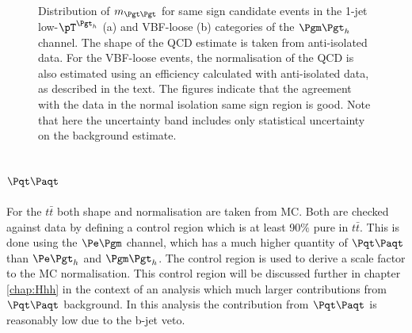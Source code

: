 \begin{figure}[htb]
\caption[Distribution of $m_{\Pgt\Pgt}$ for same sign candidate events in the
1-jet low-$\pT^{\Pgth}$ (a) and VBF-loose (b) categories of the $\mutau$
channel.]{Distribution of $m_{\Pgt\Pgt}$ for same sign candidate events in the
1-jet low-$\pT^{\Pgth}$ (a) and VBF-loose (b) categories of the $\mutau$
channel. The shape of the QCD estimate is taken from anti-isolated data. For the
VBF-loose events, the normalisation of the QCD is also estimated using an efficiency
calculated with anti-isolated data, as described in the text. 
The figures indicate that the agreement with the data in the normal isolation same sign region is good. 
Note that here the uncertainty band includes only statistical uncertainty on the
background estimate.}
\label{fig:samesign}
\end{figure}

\subsection{$\ttbar$}
\label{sec:backgroundEstimation_TT}

For the $t \bar{t}$ both shape and normalisation are taken from \ac{MC}. Both are checked
against data by defining a control region which is at least 90$\%$ pure in
$t \bar{t}$. This is done using the $\emu$ channel, which has a much higher
quantity of $\ttbar$ than $\etau$ and $\mutau$. The control region is used to
derive a scale factor to the \ac{MC} normalisation. This control region will be
discussed further in chapter \ref{chap:Hhh} in the context of an analysis which
much larger contributions from $\ttbar$ background. In this analysis the
contribution from $\ttbar$ is reasonably low due to the b-jet veto.

